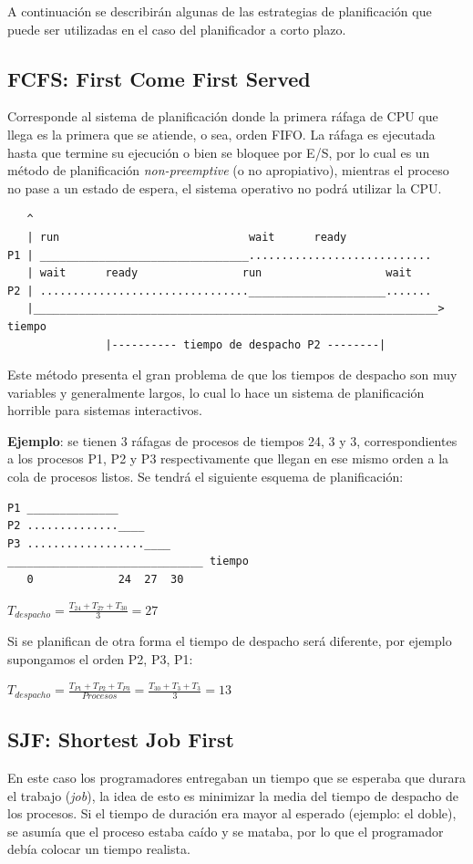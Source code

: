 A continuación se describirán algunas de las estrategias de planificación que
puede ser utilizadas en el caso del planificador a corto plazo.

\subsection{FCFS: First Come First Served}

Corresponde al sistema de planificación donde la primera ráfaga de CPU que llega
es la primera que se atiende, o sea, orden FIFO. La ráfaga es ejecutada hasta
que termine su ejecución o bien se bloquee por E/S, por lo cual es un método de
planificación \textit{non-preemptive} (o no apropiativo), mientras el proceso no
pase a un estado de espera, el sistema operativo no podrá utilizar la CPU.

\begin{verbatim}
   ^
   | run                             wait      ready
P1 | ________________________________............................
   | wait      ready                run                   wait
P2 | ................................_____________________.......
   |______________________________________________________________> tiempo
               |---------- tiempo de despacho P2 --------|
\end{verbatim}

Este método presenta el gran problema de que los tiempos de despacho son muy
variables y generalmente largos, lo cual lo hace un sistema de planificación
horrible para sistemas interactivos.

\textbf{Ejemplo}: se tienen 3 ráfagas de procesos de tiempos 24, 3 y 3,
correspondientes a los procesos P1, P2 y P3 respectivamente que llegan en ese
mismo orden a la cola de procesos listos. Se tendrá el siguiente esquema de
planificación:

\begin{verbatim}
P1 ______________
P2 ..............____
P3 ..................____
______________________________ tiempo
   0             24  27  30
\end{verbatim}

$T_{despacho} = \frac{T_{24}+T_{27}+T_{30}}{3} = 27$

Si se planifican de otra forma el tiempo de despacho será diferente, por ejemplo
supongamos el orden P2, P3, P1:

$T_{despacho} = \frac{T_{P1}+T_{P2}+T_{P3}}{Procesos} = \frac{T_{30}+T_{3}+T_{3}}{3} = 13$

\subsection{SJF: Shortest Job First}
En este caso los programadores entregaban un tiempo que se esperaba que durara
el trabajo (\textit{job}), la idea de esto es minimizar la media del tiempo de
despacho de los procesos. Si el tiempo de duración era mayor al esperado
(ejemplo: el doble), se asumía que el proceso estaba caído y se mataba, por lo
que el programador debía colocar un tiempo realista.


